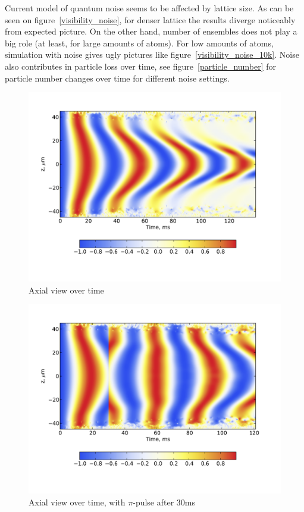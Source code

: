 \documentclass[12pt,notitlepage]{report}
\begin{document}
Current model of quantum noise seems to be affected by lattice size. As can be seen on figure~\ref{visibility_noise}, for denser lattice the results diverge noticeably from expected picture. On the other hand, number of ensembles does not play a big role (at least, for large amounts of atoms). For low amounts of atoms, simulation with noise gives ugly pictures like figure~\ref{visibility_noise_10k}. Noise also contributes in particle loss over time, see figure~\ref{particle_number} for particle number changes over time for different noise settings.

\begin{figure}
\includegraphics[width=4.5in]{axial_view.pdf}
\caption{Axial view over time}
\label{axial_view}
\end{figure}

\begin{figure}
\includegraphics[width=4.5in]{axial_pi_pulse.pdf}
\caption{Axial view over time, with $\pi$-pulse after 30ms}
\label{axial_pi_pulse}
\end{figure}
\end{document}

